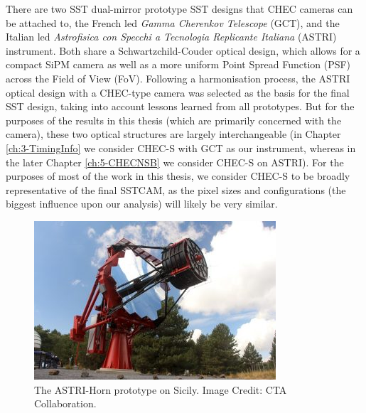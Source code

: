 There are two SST dual-mirror prototype SST designs that CHEC cameras can be attached to, the French led \textit{Gamma Cherenkov Telescope} (GCT), and the Italian led \textit{Astrofisica con Specchi a Tecnologia Replicante Italiana} (ASTRI) instrument. Both share a Schwartzchild-Couder optical design, which allows for a compact SiPM camera as well as a more uniform Point Spread Function (PSF) across the Field of View (FoV). Following a harmonisation process, the ASTRI optical design with a CHEC-type camera was selected as the basis for the final SST design, taking into account lessons learned from all prototypes. But for the purposes of the results in this thesis (which are primarily concerned with the camera), these two optical structures are largely interchangeable (in Chapter \ref{ch:3-TimingInfo} we consider CHEC-S with GCT as our instrument, whereas in the later  Chapter \ref{ch:5-CHECNSB} we consider CHEC-S on ASTRI). For the purposes of most of the work in this thesis, we consider CHEC-S to be broadly representative of the final SSTCAM, as the pixel sizes and configurations (the biggest influence upon our analysis) will likely be very similar.

\begin{figure}[ht] 
        \centering \includegraphics[width=\columnwidth]{figures/astri-horn.jpg}
        \caption{
                \label{fig:astri} %
                The ASTRI-Horn prototype on Sicily. Image Credit: CTA Collaboration.
        }
\end{figure}

